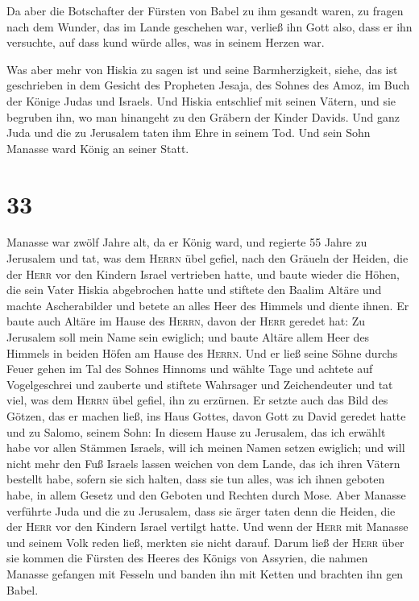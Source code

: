  Da aber die Botschafter der Fürsten von Babel zu ihm
gesandt waren, zu fragen nach dem Wunder, das im Lande geschehen war,
verließ ihn Gott also, dass er ihn versuchte, auf dass kund würde alles,
was in seinem Herzen war.

 Was aber mehr von Hiskia zu sagen ist und seine
Barmherzigkeit, siehe, das ist geschrieben in dem Gesicht des Propheten
Jesaja, des Sohnes des Amoz, im Buch der Könige Judas und Israels.
 Und Hiskia entschlief mit seinen Vätern, und sie
begruben ihn, wo man hinangeht zu den Gräbern der Kinder Davids. Und
ganz Juda und die zu Jerusalem taten ihm Ehre in seinem Tod. Und sein
Sohn Manasse ward König an seiner Statt.

\hypertarget{section-32}{%
\section{33}\label{section-32}}

 Manasse war zwölf Jahre alt, da er König ward, und
regierte 55 Jahre zu Jerusalem  und tat, was dem
\textsc{Herrn} übel gefiel, nach den Gräueln der Heiden, die der
\textsc{Herr} vor den Kindern Israel vertrieben hatte, 
und baute wieder die Höhen, die sein Vater Hiskia abgebrochen hatte und
stiftete den Baalim Altäre und machte Ascherabilder und betete an alles
Heer des Himmels und diente ihnen.  Er baute auch Altäre
im Hause des \textsc{Herrn}, davon der \textsc{Herr} geredet hat: Zu
Jerusalem soll mein Name sein ewiglich;  und baute Altäre
allem Heer des Himmels in beiden Höfen am Hause des \textsc{Herrn}.
 Und er ließ seine Söhne durchs Feuer gehen im Tal des
Sohnes Hinnoms und wählte Tage und achtete auf Vogelgeschrei und
zauberte und stiftete Wahrsager und Zeichendeuter und tat viel, was dem
\textsc{Herrn} übel gefiel, ihn zu erzürnen.  Er setzte
auch das Bild des Götzen, das er machen ließ, ins Haus Gottes, davon
Gott zu David geredet hatte und zu Salomo, seinem Sohn: In diesem Hause
zu Jerusalem, das ich erwählt habe vor allen Stämmen Israels, will ich
meinen Namen setzen ewiglich;  und will nicht mehr den Fuß
Israels lassen weichen von dem Lande, das ich ihren Vätern bestellt
habe, sofern sie sich halten, dass sie tun alles, was ich ihnen geboten
habe, in allem Gesetz und den Geboten und Rechten durch Mose.
 Aber Manasse verführte Juda und die zu Jerusalem, dass
sie ärger taten denn die Heiden, die der \textsc{Herr} vor den Kindern
Israel vertilgt hatte.  Und wenn der \textsc{Herr} mit
Manasse und seinem Volk reden ließ, merkten sie nicht darauf.
 Darum ließ der \textsc{Herr} über sie kommen die Fürsten
des Heeres des Königs von Assyrien, die nahmen Manasse gefangen mit
Fesseln und banden ihn mit Ketten und brachten ihn gen Babel.

